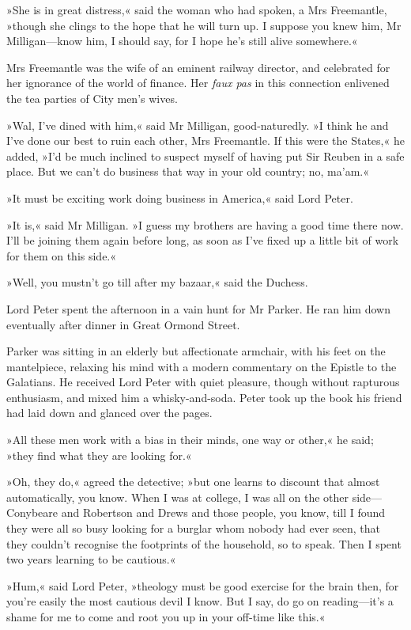 »She is in great distress,« said the woman who had spoken, a Mrs Freemantle, »though she clings to the hope that he will turn up. I suppose you knew him, Mr Milligan—know him, I should say, for I hope he's still alive somewhere.«

Mrs Freemantle was the wife of an eminent railway director, and celebrated for her ignorance of the world of finance. Her \textit{faux pas} in this connection enlivened the tea parties of City men's wives.

»Wal, I've dined with him,« said Mr Milligan, good-naturedly. »I think he and I've done our best to ruin each other, Mrs Freemantle. If this were the States,« he added, »I'd be much inclined to suspect myself of having put Sir Reuben in a safe place. But we can't do business that way in your old country; no, ma'am.«

»It must be exciting work doing business in America,« said Lord Peter.

»It is,« said Mr Milligan. »I guess my brothers are having a good time there now. I'll be joining them again before long, as soon as I've fixed up a little bit of work for them on this side.«

»Well, you mustn't go till after my bazaar,« said the Duchess.

Lord Peter spent the afternoon in a vain hunt for Mr Parker. He ran him down eventually after dinner in Great Ormond Street.

Parker was sitting in an elderly but affectionate armchair, with his feet on the mantelpiece, relaxing his mind with a modern commentary on the Epistle to the Galatians. He received Lord Peter with quiet pleasure, though without rapturous enthusiasm, and mixed him a whisky-and-soda. Peter took up the book his friend had laid down and glanced over the pages.

»All these men work with a bias in their minds, one way or other,« he said; »they find what they are looking for.«

»Oh, they do,« agreed the detective; »but one learns to discount that almost automatically, you know. When I was at college, I was all on the other side—Conybeare and Robertson and Drews and those people, you know, till I found they were all so busy looking for a burglar whom nobody had ever seen, that they couldn't recognise the footprints of the household, so to speak. Then I spent two years learning to be cautious.«

»Hum,« said Lord Peter, »theology must be good exercise for the brain then, for you're easily the most cautious devil I know. But I say, do go on reading—it's a shame for me to come and root you up in your off-time like this.«

